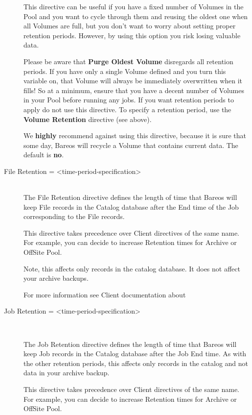 \begin{description}
This directive can be useful if you have a fixed number of Volumes in
the Pool and you want to cycle through them and reusing the oldest one
when all Volumes are full, but you don't want to worry about setting
proper retention periods.  However, by using this option you risk losing
valuable data.

Please be aware that {\bf Purge Oldest Volume} disregards all retention
periods. If you have only a single Volume defined and you turn this
variable on, that Volume will always be immediately overwritten when it
fills!  So at a minimum, ensure that you have a decent number of Volumes
in your Pool before running any jobs.  If you want retention periods to
apply do not use this directive.  To specify a retention period, use the
{\bf Volume Retention} directive (see above).

We {\bf highly} recommend against using this directive, because it is
sure that some day, Bareos will recycle a Volume that contains current
data.  The default is {\bf no}.

\item [File Retention = {\textless}time-period-specification{\textgreater}] \hfill \\
The File Retention directive defines the length of time that  Bareos will
keep File records in the Catalog database after the End time of the
Job corresponding to the File records.

This directive takes precedence over Client directives of the same name. For
example, you can decide to increase Retention times for Archive or OffSite
Pool.

Note, this affects only records in the catalog database. It does not affect
your archive backups.

For more information see Client documentation about

\item [Job Retention = {\textless}time-period-specification{\textgreater}] \hfill \\

The Job Retention directive defines the length of time that Bareos will keep
Job records in the Catalog database after the Job End time.  As with the
other retention periods, this affects only records in the catalog and not
data in your archive backup.

This directive takes precedence over Client directives of the same name.
For example, you can decide to increase Retention times for Archive or
OffSite Pool.


\end{description}

